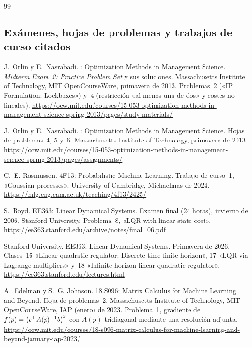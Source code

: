 \begin{thebibliography}{99}
\small

\subsection*{Exámenes, hojas de problemas y trabajos de curso citados}

J.~Orlin y E.~Nasrabadi.
: Optimization Methods in Management Science. \emph{Midterm Exam~2: Practice Problem Set} y sus soluciones.
\newblock Massachusetts Institute of Technology, MIT OpenCourseWare, primavera de 2013. Problemas~2 («IP Formulation: Lockboxes») y~4 (restricción «al menos una de dos» y costes no lineales).
\newblock \url{https://ocw.mit.edu/courses/15-053-optimization-methods-in-management-science-spring-2013/pages/study-materials/}

J.~Orlin y E.~Nasrabadi.
: Optimization Methods in Management Science. Hojas de problemas~4, 5 y~6.
\newblock Massachusetts Institute of Technology, primavera de 2013.
\newblock \url{https://ocw.mit.edu/courses/15-053-optimization-methods-in-management-science-spring-2013/pages/assignments/}

C.~E. Rasmussen.
\newblock 4F13: Probabilistic Machine Learning. Trabajo de curso~1, «Gaussian processes».
\newblock University of Cambridge, Michaelmas de 2024.
\newblock \url{https://mlg.eng.cam.ac.uk/teaching/4f13/2425/}

S.~Boyd.
\newblock EE363: Linear Dynamical Systems. Examen final (24 horas), invierno de 2006.
\newblock Stanford University. Problema~8, «LQR with linear state cost».
\newblock \url{https://ee363.stanford.edu/archive/notes/final_06.pdf}

Stanford University.
\newblock EE363: Linear Dynamical Systems.
\newblock Primavera de 2026. Clases~16 «Linear quadratic regulator: Discrete-time finite horizon», 17 «LQR via Lagrange multipliers» y~18 «Infinite horizon linear quadratic regulator».
\newblock \url{https://ee363.stanford.edu/lectures.html}

A.~Edelman y S.~G. Johnson.
\newblock 18.S096: Matrix Calculus for Machine Learning and Beyond. Hoja de problemas~2.
\newblock Massachusetts Institute of Technology, MIT OpenCourseWare, IAP (enero) de 2023. Problema~1, gradiente de $f(p)=\bigl(c^{\top} A(p)^{-1}b\bigr)^{2}$ con $A(p)$ tridiagonal mediante una resolución adjunta.
\newblock \url{https://ocw.mit.edu/courses/18-s096-matrix-calculus-for-machine-learning-and-beyond-january-iap-2023/}


\end{thebibliography}
